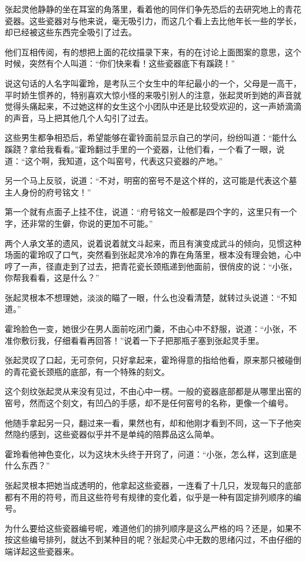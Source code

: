 张起灵他静静的坐在耳室的角落里，看着他的同伴们争先恐后的去研究地上的青花瓷器。这些瓷器对与他来说，毫无吸引力，而这几个看上去比他年长一些的学长，却已经被这些东西完全吸引了过去。

他们互相传阅，有的想把上面的花纹描录下来，有的在讨论上面图案的意思，这个时候，突然有个人叫道：“你们快来看！这些瓷器底下有蹊跷！”

说这句话的人名字叫霍玲，是考队三个女生中的年纪最小的一个，父母是一高干，平时娇生惯养的，特别喜欢大惊小怪的来吸引别人的注意，张起灵听到她的声音就觉得头痛起来，不过她这样的女生这个小团队中还是比较受欢迎的，这一声娇滴滴的声音，马上把其他几个人勾引了过去。

这些男生都争相恐后，希望能够在霍铃面前显示自己的学问，纷纷叫道：“能什么蹊跷？拿给我看看。”霍玲翻过手里的一个瓷器，让他们看，一个看了一眼，说道：“这个啊，我知道，这个叫窑号，代表这只瓷器的产地。”

另一个马上反驳，说道：“不对，明窑的窑号不是这个样的，这可能是代表这个墓主人身份的府号铭文！”

第一个就有点面子上挂不住，说道：“府号铭文一般都是四个字的，这里只有一个字，还非常的生僻，你说的更加不可能。”

两个人承文革的遗风，说着说着就文斗起来，而且有演变成武斗的倾向，见惯这种场面的霍玲叹了口气，突然看到张起灵冷冷的靠在角落里，根本没有理会她，心中哼了一声，径直走到了过去，把青花瓷长颈瓶递到他面前，很俏皮的说：“小张，你帮我看看，这是什么？”

张起灵根本不想理她，淡淡的瞄了一眼，什么也没看清楚，就转过头说道：“不知道。”

霍玲脸色一变，她很少在男人面前吃闭门羹，不由心中不舒服，说道：“小张，不准你敷衍我，仔细看看再回答！”说着一下子把那瓶子塞到张起灵手里。

张起灵叹了口起，无可奈何，只好拿起来，霍玲得意的指给他看，原来那只被碰倒的青花瓷长颈瓶的底部，有一个特殊的刻文。

这个刻纹张起灵从来没有见过，不由心中一楞。一般的瓷器底部都是从哪里出窑的窑号，然而这个刻文，有凹凸的手感，却不是任何窑号的名称，更像一个编号。

他随手拿起另一只，翻过来一看，果然也有，却和他刚才看到不同，这一下子他突然隐约感到，这些瓷器似乎并不是单纯的陪葬品这么简单。

霍玲看他神色变化，以为这块木头终于开窍了，问道：“小张，怎么样，这到底是什么东西？”

张起灵根本把她当成透明的，他拿起这些瓷器，一连看了十几只，发现每只的底部都有不用的符号，而且这些符号有规律的变化着，似乎是一种有固定排列顺序的编号。

为什么要给这些瓷器编号呢，难道他们的排列顺序是这么严格的吗？还是，如果不按这些编号排列，就达不到某种目的呢？张起灵心中无数的思绪闪过，不由仔细的端详起这些瓷器来。

